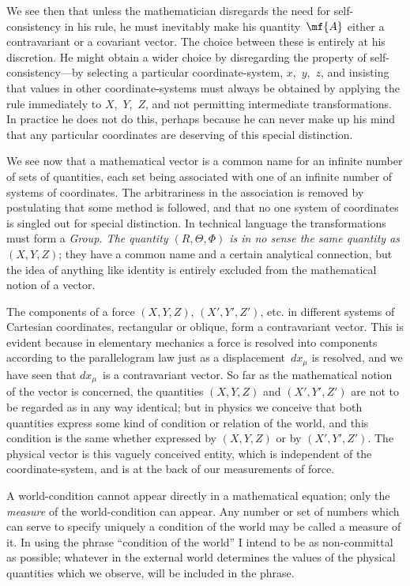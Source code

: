 \documentclass[12pt]{book}
\begin{document}
We see then that unless the mathematician disregards the need for self\hyp{}consistency
in his rule, he must inevitably make his quantity~$\mf{A}$ either a
contravariant or a covariant vector. The choice between these is entirely at
his discretion. He might obtain a wider choice by disregarding the property
of self\hyp{}consistency---by selecting a particular coordinate\hyp{}system, $x$,~$y$,~$z$, and
insisting that values in other coordinate\hyp{}systems must always be obtained by
applying the rule immediately to $X$,~$Y$,~$Z$, and not permitting intermediate
transformations. In practice he does not do this, perhaps because he can
never make up his mind that any particular coordinates are deserving of this
special distinction.

We see now that a mathematical vector is a common name for an infinite
%
number of sets of quantities, each set being associated with one of an infinite
number of systems of coordinates. The arbitrariness in the association is
removed by postulating that some method is followed, and that no one
system of coordinates is singled out for special distinction. In technical
language the transformations must form a \emph{Group. The quantity $(R, \Theta, \Phi)$
%
is in no sense the same quantity as $(X, Y, Z)$}; they have a common name and
a certain analytical connection, but the idea of anything like identity is
entirely excluded from the mathematical notion of a vector.


The components of a force $(X, Y, Z)$, $(X', Y', Z')$, etc. in different systems
of Cartesian coordinates, rectangular or oblique, form a contravariant vector.
This is evident because in elementary mechanics a force is resolved into
components according to the parallelogram law just as a displacement~$dx_{\mu}$ is
resolved, and we have seen that $dx_{\mu}$~is a contravariant vector. So far as the
mathematical notion of the vector is concerned, the quantities $(X, Y, Z)$ and
$(X', Y', Z')$ are not to be regarded as in any way identical; but in physics
we conceive that both quantities express some kind of condition or relation
of the world, and this condition is the same whether expressed by $(X, Y, Z)$
or by $(X', Y', Z')$. The physical vector is this vaguely conceived entity, which
is independent of the coordinate\hyp{}system, and is at the back of our measurements
of force.

A world\hyp{}condition cannot appear directly in a mathematical equation;
only the \emph{measure} of the world\hyp{}condition can appear. Any number or set of
numbers which can serve to specify uniquely a condition of the world may
%
be called a measure of it. In using the phrase ``condition of the world''
I intend to be as non\hyp{}committal as possible; whatever in the external world
determines the values of the physical quantities which we observe, will be
included in the phrase.
\end{document}
